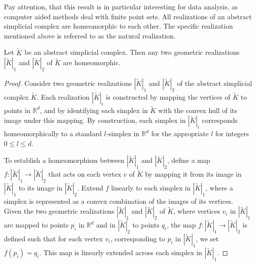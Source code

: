 Pay attention, that this result is in particular interesting for data analysis, as computer aided methods deal with finite point sets. All realizations of an abstract simplicial complex are homeomorphic to each other.
The specific realization mentioned above is referred to as the natural
realization.

\begin{proposition}
	Let $\tilde{K}$ be an abstract simplicial complex. Then any two geometric
	realizations $|\tilde{K}|_{1}$ and $|\tilde{K}|_{2}$ of $\tilde{K}$ are
	homeomorphic.
\end{proposition}

\begin{proof}
	Consider two geometric realizations $|\tilde{K}|_{1}$ and $|\tilde{K}|_{2}$ of
	the abstract simplicial complex $\tilde{K}$. Each realization
	$|\tilde{K}|_{i}$ is constructed by mapping the vertices of $\tilde{K}$ to
	points in $\mathbb{R}^{d}$, and by identifying each simplex in $\tilde{K}$ with
	the convex hull of its image under this mapping. By construction, each simplex
	in $|\tilde{K}|_{i}$ corresponds homeomorphically to a standard $l$-simplex in
	$\mathbb{R}^{d}$ for the appropriate $l$ for integers $0 \leq l \leq d$.

	To establish a homeomorphism between $|\tilde{K}|_{1}$ and $|\tilde{K}|_{2}$,
	define a map $f: |\tilde{K}|_{1} \to |\tilde{K}|_{2}$ that acts on each vertex
	$v$ of $\tilde{K}$ by mapping it from its image in $|\tilde{K}|_{1}$ to its
	image in $|\tilde{K}|_{2}$. Extend $f$ linearly to each simplex in $|\tilde{K}|
	_{1}$, where a simplex is represented as a convex combination of the images of
	its vertices. Given the two geometric realizations $|\tilde{K}|_{1}$ and $|\tilde{K}|_{2}$
	of $\tilde{K}$, where vertices $v_{i}$ in $|\tilde{K}|_{1}$ are mapped to points
	$p_{i}$ in $\mathbb{R}^{d}$ and in $|\tilde{K}|_{2}$ to points $q_{i}$, the
	map $f: |\tilde{K}|_{1} \to |\tilde{K}|_{2}$ is defined such that for each
	vertex $v_{i}$, corresponding to $p_{i}$ in $|\tilde{K}|_{1}$, we set
	$f(p_{i}) = q_{i}$. This map is linearly extended across each simplex in $|\tilde
	{K}|_{1}$.


\end{proof}
